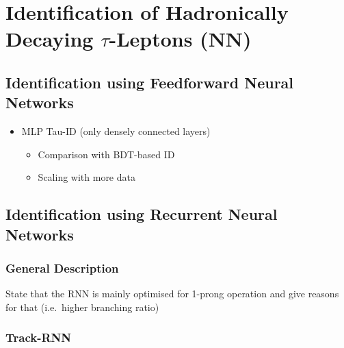 \chapter{Identification of Hadronically Decaying $\tau$-Leptons (NN)}
\label{sec:rnn}

\section{Identification using Feedforward Neural Networks}
\label{sec:ffnn_id}

\begin{itemize}
\item MLP Tau-ID (only densely connected layers)
  \begin{itemize}
  \item Comparison with BDT-based ID
  \item Scaling with more data
  \end{itemize}
\end{itemize}

\section{Identification using Recurrent Neural Networks}
\label{sec:rnn_id}

\subsection{General Description}
\label{sec:rnn_descr}

State that the RNN is mainly optimised for 1-prong operation and give reasons
for that (i.e.\ higher branching ratio)

\subsection{Track-RNN}
\label{sec:rnn_tracks}





